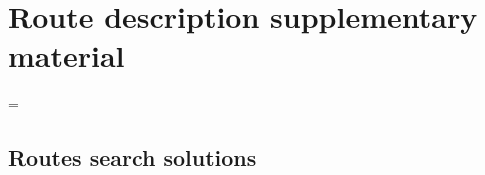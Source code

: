 \chapter{Route description supplementary material}
\label{app:route}

\LTcapwidth=\textwidth


\let\oldlongtable\longtable
\let\endoldlongtable\endlongtable

\def\zza{\global\let\zz\zzb
\fullwidthcolor{lightgray}}%

\def\zzb{\global\let\zz\zza}

\def\fullwidthcolor#1{\color{#1}\leaders\vrule\hskip\textwidth\hskip-\textwidth\kern0pt}
\def\resetLTcolor{\global\let\zz\zza}


\section{Routes search solutions}
\label{app:solutions}

